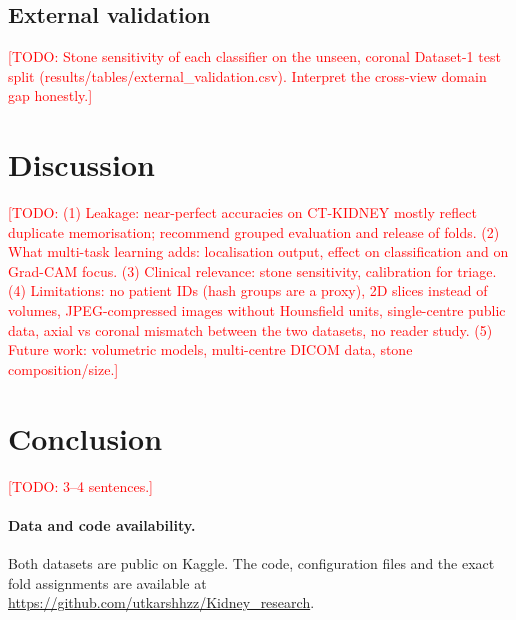 \documentclass[11pt]{article}
\newcommand{\todo}[1]{\textcolor{red}{[TODO: #1]}}
\begin{document}
\subsection{External validation}
\todo{Stone sensitivity of each classifier on the unseen, coronal Dataset-1 test split
(results/tables/external\_validation.csv). Interpret the cross-view domain gap honestly.}

\section{Discussion}
\todo{(1) Leakage: near-perfect accuracies on CT-KIDNEY mostly reflect duplicate memorisation; recommend grouped
evaluation and release of folds. (2) What multi-task learning adds: localisation output, effect on classification
and on Grad-CAM focus. (3) Clinical relevance: stone sensitivity, calibration for triage. (4) Limitations: no
patient IDs (hash groups are a proxy), 2D slices instead of volumes, JPEG-compressed images without Hounsfield
units, single-centre public data, axial vs coronal mismatch between the two datasets, no reader study.
(5) Future work: volumetric models, multi-centre DICOM data, stone composition/size.}

\section{Conclusion}
\todo{3--4 sentences.}

\paragraph{Data and code availability.} Both datasets are public on Kaggle. The code, configuration files and the
exact fold assignments are available at \url{https://github.com/utkarshhzz/Kidney_research}.



\end{document}
